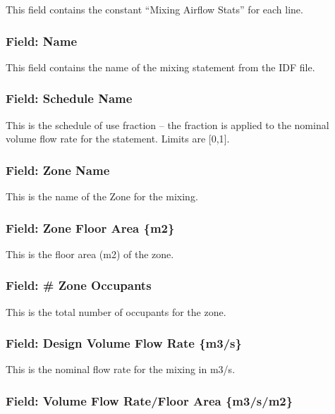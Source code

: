 This field contains the constant ``Mixing Airflow Stats'' for each line.

\subsubsection{Field: Name}\label{field-name-8}

This field contains the name of the mixing statement from the IDF file.

\subsubsection{Field: Schedule Name}\label{field-schedule-name-7}

This is the schedule of use fraction -- the fraction is applied to the nominal volume flow rate for the statement. Limits are {[}0,1{]}.

\subsubsection{Field: Zone Name}\label{field-zone-name-9}

This is the name of the Zone for the mixing.

\subsubsection{Field: Zone Floor Area \{m2\}}\label{field-zone-floor-area-m2-7}

This is the floor area (m2) of the zone.

\subsubsection{Field: \# Zone Occupants}\label{field-zone-occupants-7}

This is the total number of occupants for the zone.

\subsubsection{Field: Design Volume Flow Rate \{m3/s\}}\label{field-design-volume-flow-rate-m3s-2}

This is the nominal flow rate for the mixing in m3/s.

\subsubsection{Field: Volume Flow Rate/Floor Area \{m3/s/m2\}}\label{field-volume-flow-ratefloor-area-m3sm2-2}

